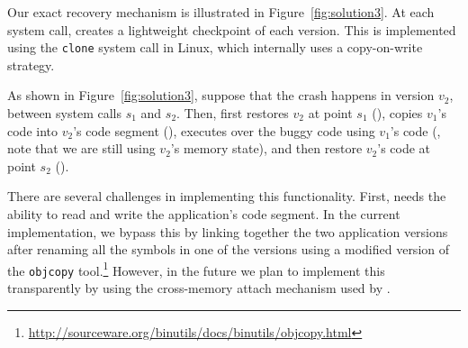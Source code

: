



Our exact recovery mechanism is illustrated in
Figure~\ref{fig:solution3}.  At each system call, \mx creates a
lightweight checkpoint of each version.  This is implemented using the
\lstinline`clone` system call in Linux, which internally uses a
copy-on-write strategy.  

As shown in Figure~\ref{fig:solution3}, suppose that the crash happens in
version $v_2$, between system calls $s_1$ and $s_2$.  Then, \rem first restores
$v_2$ at point $s_1$ (), copies $v_1$'s code into $v_2$'s code segment
(), executes over the buggy code using $v_1$'s code (, note
that we are still using $v_2$'s memory state), and then restore $v_2$'s code at
point $s_2$ ().

There are several challenges in implementing this functionality.
First, \rem needs the ability to read and write the application's code
segment.  In the current implementation, we bypass this by linking
together the two application versions after renaming all the symbols
in one of the versions using a modified version of
the \texttt{objcopy}
tool.\footnote{\url{http://sourceware.org/binutils/docs/binutils/objcopy.html}}
However, in the future we plan to implement this transparently by
using the cross-memory attach mechanism used by \mxm.

